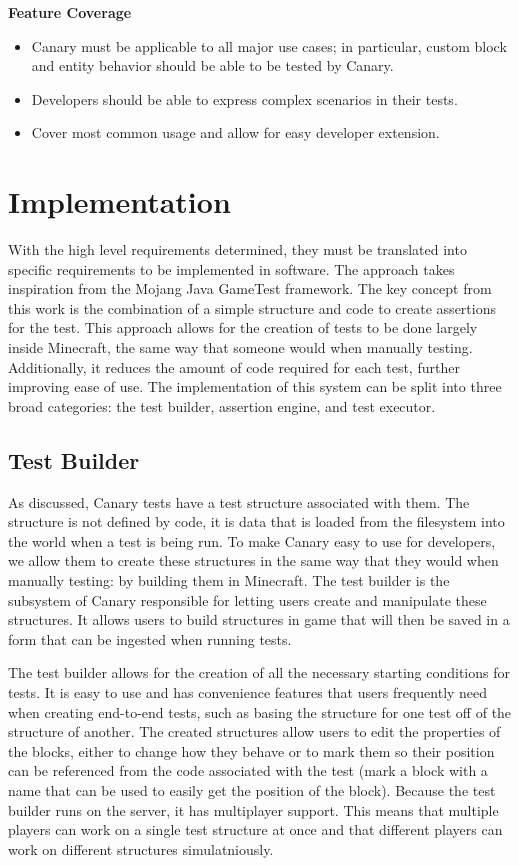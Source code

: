 \documentclass{article}
\begin{document}
\begin{onehalfspacing}
\textbf{Feature Coverage}

\begin{itemize}
\item
  Canary must be applicable to all major use cases; in particular,
  custom block and entity behavior should be able to be tested by
  Canary.
\item
  Developers should be able to express complex scenarios in their tests.
\item
  Cover most common usage and allow for easy developer extension.
\end{itemize}

\section{Implementation}

With the high level requirements determined, they must be translated
into specific requirements to be implemented in software. The approach
takes inspiration from the Mojang Java GameTest framework. The key
concept from this work is the combination of a simple structure and code
to create assertions for the test. This approach allows for the creation
of tests to be done largely inside Minecraft, the same way that someone
would when manually testing. Additionally, it reduces the amount of code
required for each test, further improving ease of use. The
implementation of this system can be split into three broad categories:
the test builder, assertion engine, and test executor.

\subsection{Test Builder}

As discussed, Canary tests have a test structure associated with them.
The structure is not defined by code, it is data that is loaded from the
filesystem into the world when a test is being run. To make Canary easy
to use for developers, we allow them to create these structures in the
same way that they would when manually testing: by building them in
Minecraft. The test builder is the subsystem of Canary responsible for
letting users create and manipulate these structures. It allows users to
build structures in game that will then be saved in a form that can be
ingested when running tests.

The test builder allows for the creation of all the necessary starting
conditions for tests. It is easy to use and has convenience features
that users frequently need when creating end-to-end tests, such as
basing the structure for one test off of the structure of another. The
created structures allow users to edit the properties of the blocks,
either to change how they behave or to mark them so their position can
be referenced from the code associated with the test (mark a block with
a name that can be used to easily get the position of the block).
Because the test builder runs on the server, it has multiplayer support.
This means that multiple players can work on a single test structure at
once and that different players can work on different structures
simulatniously.


\end{onehalfspacing}
\end{document}
